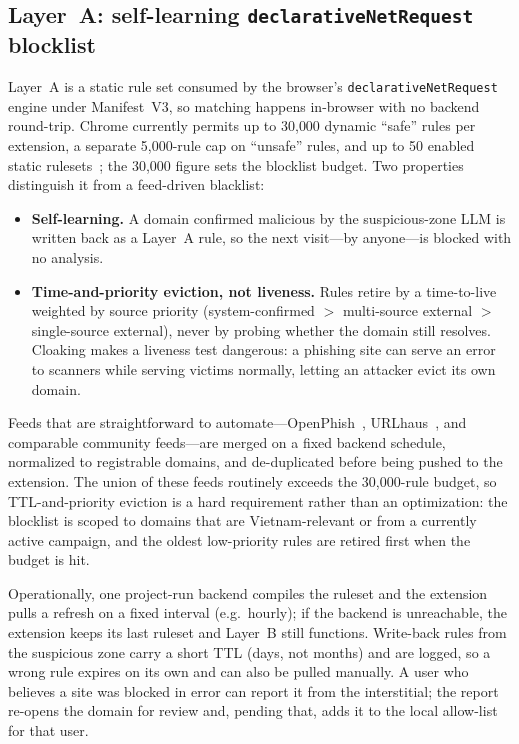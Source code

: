 \documentclass[conference]{IEEEtran}
\begin{document}
\subsection{Layer~A: self-learning \texttt{declarativeNetRequest} blocklist}
Layer~A is a static rule set consumed by the browser's
\texttt{declarativeNetRequest} engine under Manifest~V3, so matching happens
in-browser with no backend round-trip. Chrome currently permits up to 30{,}000
dynamic ``safe'' rules per extension, a separate 5{,}000-rule cap on ``unsafe''
rules, and up to 50 enabled static rulesets~\cite{chrome_dnr}; the 30{,}000
figure sets the blocklist budget. Two properties distinguish it from a
feed-driven blacklist:
\begin{itemize}
\item \textbf{Self-learning.} A domain confirmed malicious by the suspicious-zone
LLM is written back as a Layer~A rule, so the next visit---by anyone---is blocked
with no analysis.
\item \textbf{Time-and-priority eviction, not liveness.} Rules retire by a
time-to-live weighted by source priority (system-confirmed $>$ multi-source
external $>$ single-source external), never by probing whether the domain still
resolves. Cloaking makes a liveness test dangerous: a phishing site can serve an
error to scanners while serving victims normally, letting an attacker evict its
own domain.
\end{itemize}
Feeds that are straightforward to automate---OpenPhish~\cite{openphish},
URLhaus~\cite{urlhaus}, and comparable community feeds---are merged on a fixed
backend schedule, normalized to registrable domains, and de-duplicated before
being pushed to the extension. The union of these feeds routinely exceeds the
30{,}000-rule budget, so TTL-and-priority eviction is a hard requirement rather
than an optimization: the blocklist is scoped to domains that are Vietnam-relevant
or from a currently active campaign, and the oldest low-priority rules are
retired first when the budget is hit.

Operationally, one project-run backend compiles the ruleset and the extension
pulls a refresh on a fixed interval (e.g.\ hourly); if the backend is
unreachable, the extension keeps its last ruleset and Layer~B still functions.
Write-back rules from the suspicious zone carry a short TTL (days, not months) and
are logged, so a wrong rule expires on its own and can also be pulled manually. A
user who believes a site was blocked in error can report it from the interstitial;
the report re-opens the domain for review and, pending that, adds it to the
local allow-list for that user.
\end{document}
